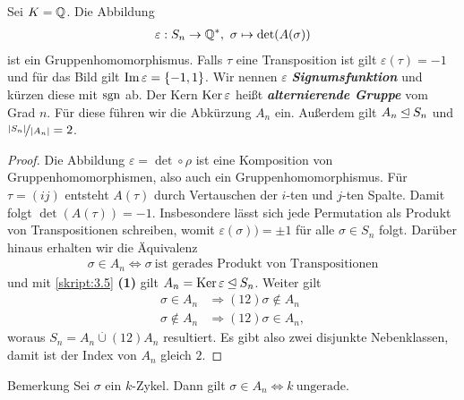 \begin{sz} \label{skript:3.13}  
	Sei $ K = \mathbb{Q} $. Die Abbildung
	\begin{align*}
	\varepsilon : S_n \to \mathbb{Q}^\ast , \ \sigma \mapsto \det(A(\sigma))
	\end{align*}
	ist ein Gruppenhomomorphismus. Falls $ \tau  $ eine Transposition ist gilt $ \varepsilon(\tau) = -1 $ und für das Bild
	gilt $ \operatorname{Im} \varepsilon = \lbrace -1, 1 \rbrace $.
	Wir nennen $ \varepsilon $ \textbf{\textit{Signumsfunktion}} und kürzen diese mit $ \operatorname{sgn} $ ab.
	Der Kern $ \operatorname{Ker} \varepsilon $ heißt \textbf{\textit{alternierende Gruppe}} vom Grad $ n $. Für diese führen wir die Abkürzung
	$ A_n $ ein.
	Außerdem gilt $ A_n \unlhd S_n $ und $ \nicefrac{|S_n|}{|A_n|} = 2$.
\end{sz}

\begin{proof}
	Die Abbildung $ \varepsilon = \det \circ \rho $ ist eine Komposition von Gruppenhomomorphismen, also auch ein Gruppenhomomorphismus. Für $ \tau = (ij) $ entsteht $ A(\tau) $ durch Vertauschen der $ i $-ten und $ j $-ten Spalte.
	Damit folgt $ \det(A(\tau)) = -1 $. Insbesondere lässt sich jede Permutation als Produkt von Transpositionen schreiben, womit $ \varepsilon(\sigma) ) = \pm 1 $ für alle $ \sigma \in S_n  $ folgt. 
	Darüber hinaus erhalten wir die Äquivalenz
	\begin{align*}
	\sigma \in A_n \Leftrightarrow \sigma \ \text{ist gerades Produkt von Transpositionen}
	\end{align*}
	und mit \ref{skript:3.5} \textbf{(1)} gilt $ A_n = \operatorname{Ker} \varepsilon \unlhd S_n $.
	Weiter gilt
	\begin{align*}
	\sigma \in A_n &\Rightarrow (12)\sigma \notin A_n\\
	\sigma \notin A_n &\Rightarrow (12) \sigma \in A_n,
	\end{align*}
	woraus $ S_n = A_n \stackrel{.}{\cup} (12)A_n $ resultiert. Es gibt also zwei disjunkte Nebenklassen, damit ist der Index von $ A_n $ gleich $ 2 $.
\end{proof}

\begin{genericdf}{Bemerkung} \label{skript:3.14}
	Sei $ \sigma $ ein $ k $-Zykel. Dann gilt $ \sigma \in A_n \Leftrightarrow k \ \text{ungerade} $.
\end{genericdf}